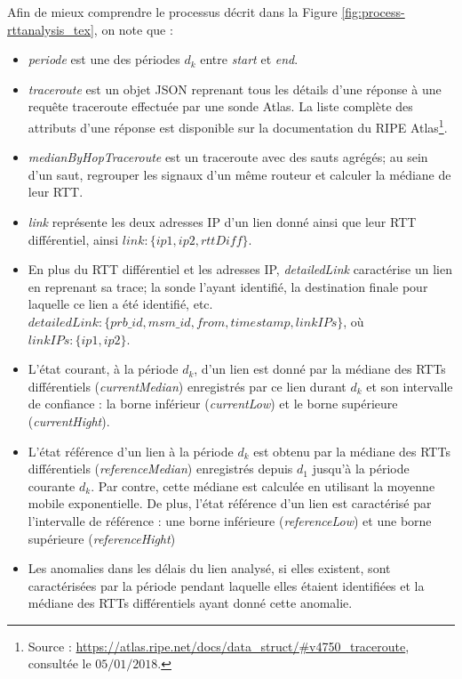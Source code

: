 Afin de mieux comprendre le processus décrit dans la Figure \ref{fig:process-rttanalysis_tex}, on note que :

\begin{itemize}
	\item \textit{periode} est une des périodes $d_k$ entre \textit{start} et \textit{end}. 
	
	\item \textit{traceroute} est un objet JSON reprenant tous les détails d'une réponse à une requête traceroute effectuée par une sonde Atlas. La liste complète des attributs d'une réponse est disponible sur la documentation du RIPE Atlas\footnote{Source : \url{https://atlas.ripe.net/docs/data_struct/\#v4750_traceroute}, consultée le $05/01/2018$.}.
	
	\item  \textit{medianByHopTraceroute} est un traceroute avec des sauts  agrégés; au sein d'un saut, regrouper les signaux d'un même routeur et calculer la médiane de leur RTT.
	
	\item  \textit{link}  représente les deux adresses IP d'un lien donné ainsi que leur RTT différentiel, ainsi  $ link : \{ip1, ip2, rttDiff\} $.
	
	\item En plus du RTT différentiel et les adresses IP, \textit{detailedLink} caractérise un lien en reprenant sa trace; la sonde l'ayant identifié, la destination finale pour  laquelle ce lien a été identifié, etc. $ detailedLink :\{prb\_id, msm\_id, from, timestamp, linkIPs\} $, où $ linkIPs: \{ip1, ip2\} $.
	
	\item L'état courant, à la période $d_k$, d'un lien est donné par la médiane des  RTTs différentiels (\textit{currentMedian}) enregistrés par ce lien durant $d_k$ et  son intervalle de confiance : la borne inférieur (\textit{currentLow}) et  le borne supérieure (\textit{currentHight}).  
	
	\item L'état référence d'un lien à la période $d_k$ est  obtenu par la médiane des RTTs différentiels (\textit{referenceMedian}) enregistrés depuis $d_1$ jusqu'à la période courante $d_k$. Par contre, cette médiane est calculée en utilisant la moyenne mobile exponentielle. De plus, l'état référence d'un lien est caractérisé par l'intervalle de référence : une borne inférieure (\textit{referenceLow}) et une borne supérieure (\textit{referenceHight})
	
	\item Les anomalies dans les délais du lien analysé, si elles existent, sont caractérisées par la période pendant laquelle elles étaient identifiées et la médiane des RTTs différentiels ayant donné cette anomalie.
\end{itemize} 

